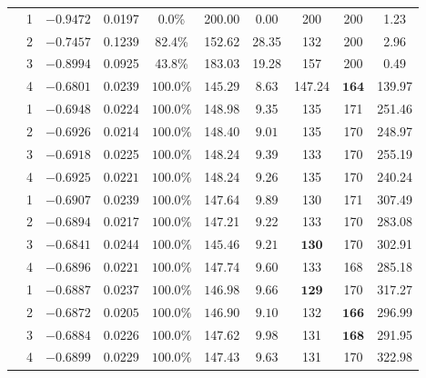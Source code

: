 \documentclass[
    a4paper,
    11pt,
    bibliography=totoc,
    listof=totoc,      
    headinclude=true,
    cleardoublepage=empty,
]{scrbook}
\theoremstyle{plain}
\theoremstyle{definition}
\theoremstyle{remark}
\begin{document}
\begin{table}[htpb!]
\begin{tabular*}{0.98\textwidth}{%
        >{\centering}m{0.4cm} c | @{\extracolsep{\fill}}  *{8}{c} 
    }
\multirow{4}{*}{${3}$} 
& 1 & $-0.9472$ & 0.0197 & 0.0\% & 200.00 & 0.00 & 200 & 200 & 1.23 \\
& 2 & $-0.7457$ & 0.1239 & 82.4\% & 152.62 & 28.35 & 132 & 200 & 2.96 \\
& 3 & $-0.8994$ & 0.0925 & 43.8\% & 183.03 & 19.28 & 157 & 200 & 0.49 \\
& 4 & $\bm{-0.6801}$ & 0.0239 & $\bm{100.0\%}$ & $\bm{145.29}$ & $\bm{8.63}$ & 147.24 & $\bm{164}$ & 139.97 \\       
    
        \midrule

\multirow{4}{*}{${4}$} 
& 1 & $-0.6948$ & 0.0224 & $\bm{100.0\%}$ & 148.98 & 9.35 & 135 & 171 & 251.46 \\
& 2 & $-0.6926$ & 0.0214 & $\bm{100.0\%}$ & 148.40 & $\bm{9.01}$ & 135 & 170 & 248.97 \\
& 3 & $-0.6918$ & 0.0225 & $\bm{100.0\%}$ & 148.24 & 9.39 & 133 & 170 & 255.19 \\
& 4 & $-0.6925$ & $\bm{0.0221}$ & $\bm{100.0\%}$ & 148.24 & 9.26 & 135 & 170 & 240.24 \\ 

        \midrule
        
\multirow{4}{*}{${5}$} 
& 1 & $-0.6907$ & 0.0239 & $\bm{100.0\%}$ & 147.64 & 9.89 & 130 & 171 & 307.49 \\
& 2 & $-0.6894$ & 0.0217 & $\bm{100.0\%}$ & 147.21 & 9.22 & 133 & 170 & 283.08 \\
& 3 & $\bm{-0.6841}$ & 0.0244 & $\bm{100.0\%}$ & $\bm{145.46}$ & $\bm{9.21}$ & $\bm{130}$ & 170 & 302.91 \\
& 4 & $-0.6896$ & $\bm{0.0221}$ & $\bm{100.0\%}$ & 147.74 & 9.60 & 133 & 168 & 285.18 \\

        \midrule
        
\multirow{4}{*}{${6}$} 
& 1 & $-0.6887$ & 0.0237 & $\bm{100.0\%}$ & $\bm{146.98}$ & 9.66 & $\bm{129}$ & 170 & 317.27 \\
& 2 & $\bm{-0.6872}$ & $\bm{0.0205}$ & $\bm{100.0\%}$ & $\bm{146.90}$ & $\bm{9.10}$ & 132 & $\bm{166}$ & 296.99 \\
& 3 & $-0.6884$ & 0.0226 & $\bm{100.0\%}$ & 147.62 & 9.98 & 131 & $\bm{168}$ & 291.95 \\
& 4 & $-0.6899$ & 0.0229 & $\bm{100.0\%}$ & 147.43 & 9.63 & 131 & 170 & 322.98 \\

        \midrule


\end{tabular*}
\end{table}
\end{document}
